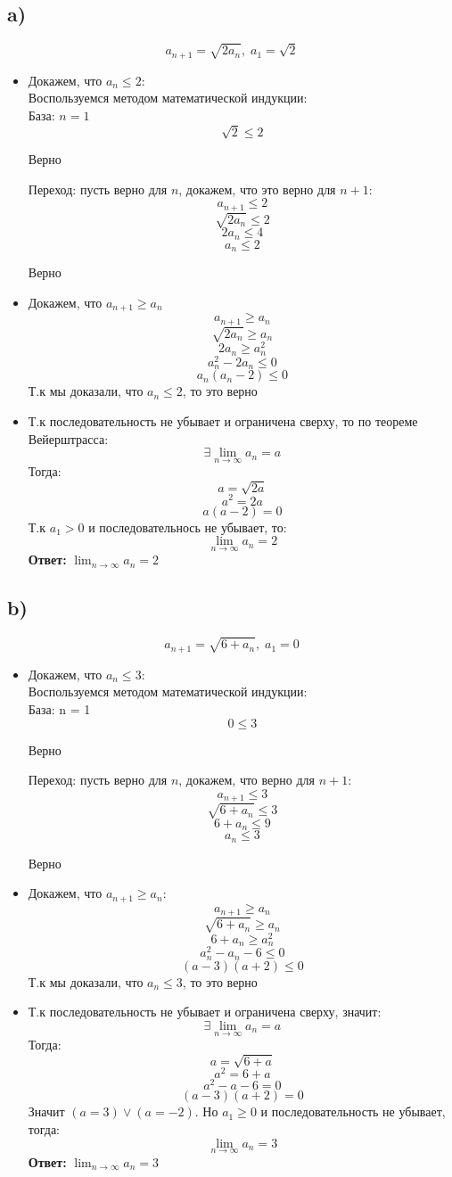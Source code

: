 \documentclass[a4paper,12pt]{article}
\begin{document}
\subsection*{a)}
\[
a_{n+1} = \sqrt{2a_n}, \; a_1 = \sqrt{2}
\]
\begin{itemize}
\item Докажем,  что $a_n \leq 2$:
\\
Воспользуемся методом математической индукции:
\\
База:  $n = 1 $
\[
\sqrt{2} \leq 2
\]
\begin{center}
Верно
\end{center}
Переход: пусть верно для  $n$, докажем, что это верно для $n+1$:
\[
a_{n+1} \leq 2
\]
\[
\sqrt{2a_n} \leq 2
\]
\[
2a_n \leq 4
\]
\[
a_n \leq 2
\]
\begin{center}
Верно
\end{center}
\item Докажем, что $a_{n+1} \geq a_n $
\\
\[
a_{n+1} \geq a_n
\]
\[
\sqrt{2a_n} \geq a_n
\]
\[
2a_n \geq a_n^2
\]
\[
a^2_n - 2a_n \leq 0
\]
\[
a_n(a_n-2) \leq 0
\]
Т.к мы доказали, что $a_n \leq 2$, то это верно 
\\
\item Т.к последовательность не убывает и ограничена сверху, то по теореме Вейерштрасса:
\[
\exists \lim_{n \rightarrow \infty} a_n = a
\]
Тогда:
\[
a = \sqrt{2a}
\]
\[
a^2 = 2a
\]
\[
a(a-2) = 0
\]
Т.к $a_1 > 0$ и последовательнось не убывает, то:
\[
\lim_{n \rightarrow \infty} a_n = 2
\]
\textbf{Ответ:} $\lim_{n \rightarrow \infty} a_n = 2$
\end{itemize}
\subsection*{b)}
\[
a_{n+1} = \sqrt{6 + a_n}, \; a_1 = 0
\]
\begin{itemize}
\item Докажем, что $a_n \leq 3$:
\\
Воспользуемся методом математической индукции:
\\
База: n = 1 
\[
0 \leq 3
\]
\begin{center}
Верно
\end{center}
Переход: пусть верно для $n$, докажем, что верно для $n+1$:
\[
a_{n+1} \leq 3
\]
\[
\sqrt{6 + a_n} \leq 3
\]
\[
6 + a_n \leq 9 
\]
\[
a_n \leq 3
\]
\begin{center}
Верно
\end{center}
\item Докажем, что $a_{n+1} \geq a_n $:
\[
a_{n+1} \geq a_n
\]
\[
\sqrt{6+a_n} \geq a_n
\]
\[
6 + a_n \geq a_n^2
\]
\[
a_n^2 - a_n -6 \leq 0
\]
\[
(a - 3)(a +2) \leq 0
\]
Т.к мы доказали, что $ a_n \leq 3$,  то это верно
\\
\item Т.к последовательность не убывает и ограничена сверху, значит:
\[
\exists \lim_{n \rightarrow \infty } a_n = a
\]
Тогда:
\[
a = \sqrt{6 + a}
\]
\[
a^2 = 6 + a
\]
\[
a^2 - a - 6 = 0
\]
\[
(a-3)(a+2) = 0
\]
Значит $(a = 3) \vee (a = -2)$. Но $a_1 \geq 0$ и последовательность не убывает, тогда:
\[
\lim_{n \rightarrow \infty} a_n = 3
\]
\textbf{Ответ:} $\lim_{n \rightarrow \infty} a_n = 3$
\end{itemize}
\end{document}
